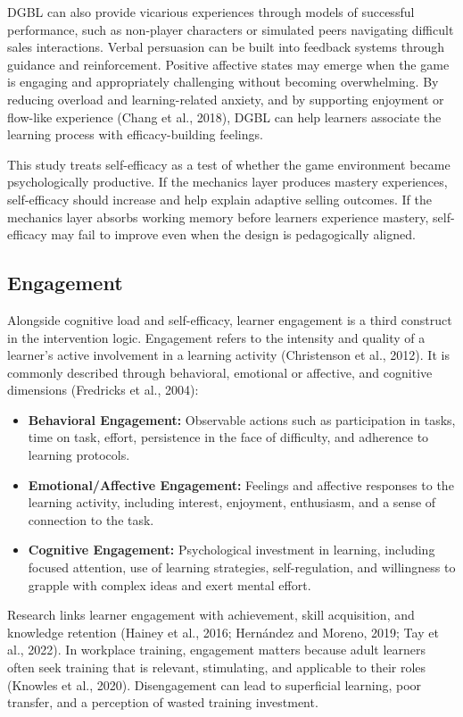 \documentclass[12pt]{report}
\begin{document}
DGBL can also provide vicarious experiences through models of successful performance, such as non-player characters or simulated peers navigating difficult sales interactions. Verbal persuasion can be built into feedback systems through guidance and reinforcement. Positive affective states may emerge when the game is engaging and appropriately challenging without becoming overwhelming. By reducing overload and learning-related anxiety, and by supporting enjoyment or flow-like experience (Chang et al., 2018), DGBL can help learners associate the learning process with efficacy-building feelings.

This study treats self-efficacy as a test of whether the game environment became psychologically productive. If the mechanics layer produces mastery experiences, self-efficacy should increase and help explain adaptive selling outcomes. If the mechanics layer absorbs working memory before learners experience mastery, self-efficacy may fail to improve even when the design is pedagogically aligned.

\subsection{Engagement}
Alongside cognitive load and self-efficacy, learner engagement is a third construct in the intervention logic. Engagement refers to the intensity and quality of a learner's active involvement in a learning activity (Christenson et al., 2012). It is commonly described through behavioral, emotional or affective, and cognitive dimensions (Fredricks et al., 2004):

\begin{itemize}[leftmargin=1.2cm]
    \item \textbf{Behavioral Engagement:} Observable actions such as participation in tasks, time on task, effort, persistence in the face of difficulty, and adherence to learning protocols.
    \item \textbf{Emotional/Affective Engagement:} Feelings and affective responses to the learning activity, including interest, enjoyment, enthusiasm, and a sense of connection to the task.
    \item \textbf{Cognitive Engagement:} Psychological investment in learning, including focused attention, use of learning strategies, self-regulation, and willingness to grapple with complex ideas and exert mental effort.
\end{itemize}

Research links learner engagement with achievement, skill acquisition, and knowledge retention (Hainey et al., 2016; Hern\'andez and Moreno, 2019; Tay et al., 2022). In workplace training, engagement matters because adult learners often seek training that is relevant, stimulating, and applicable to their roles (Knowles et al., 2020). Disengagement can lead to superficial learning, poor transfer, and a perception of wasted training investment.
\end{document}
